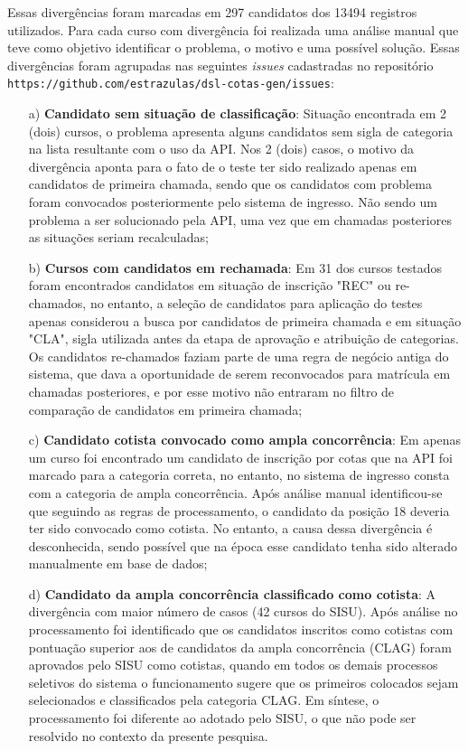 Essas divergências foram marcadas em 297 candidatos dos 13494 registros utilizados. Para cada curso com divergência foi realizada uma análise manual que teve como objetivo identificar o problema, o motivo e uma possível solução. Essas divergências foram agrupadas nas seguintes \textit{issues} cadastradas no repositório \texttt{https://github.com/estrazulas/dsl-cotas-gen/issues}:

\begin{enumerate}
    \item[a)] \textbf{Candidato sem situação de classificação}: Situação encontrada em 2 (dois) cursos, o problema apresenta alguns candidatos sem sigla de categoria na lista resultante com o uso da API. Nos 2 (dois) casos, o motivo da divergência aponta para o fato de o teste ter sido realizado apenas em candidatos de primeira chamada, sendo que os candidatos com problema foram convocados posteriormente pelo sistema de ingresso. Não sendo um problema a ser solucionado pela API, uma vez que em chamadas posteriores as situações seriam recalculadas;
    
    \item[b)] \textbf{Cursos com candidatos em rechamada}: Em 31 dos cursos testados foram encontrados candidatos em situação de inscrição "REC" ou re-chamados, no entanto, a seleção de candidatos para aplicação do testes apenas considerou a busca por candidatos de primeira chamada e em situação "CLA", sigla utilizada antes da etapa de aprovação e atribuição de categorias. Os candidatos re-chamados faziam parte de uma regra de negócio antiga do sistema, que dava a oportunidade de serem reconvocados para matrícula em chamadas posteriores, e por esse motivo não entraram no filtro de comparação de candidatos em primeira chamada;
    
    \item[c)] \textbf{Candidato cotista convocado como ampla concorrência}: Em apenas um curso foi encontrado um candidato de inscrição por cotas que na API foi marcado para a categoria correta, no entanto, no sistema de ingresso consta com a categoria de ampla concorrência. Após análise manual identificou-se que seguindo as regras de processamento, o candidato da posição 18 deveria ter sido convocado como cotista. No entanto, a causa dessa divergência é desconhecida, sendo possível que na época esse candidato tenha sido alterado manualmente em base de dados;
    
      
    \item[d)] \textbf{Candidato da ampla concorrência classificado como cotista}: A divergência com maior número de casos (42 cursos do \gls{SISU}). Após análise no processamento foi identificado que os candidatos inscritos como cotistas com pontuação superior aos de candidatos da ampla concorrência (CLAG) foram aprovados pelo \gls{SISU} como cotistas, quando em todos os demais processos seletivos do sistema o funcionamento sugere que os primeiros colocados sejam selecionados e classificados pela categoria CLAG. Em síntese, o processamento foi diferente ao adotado pelo SISU, o que não pode ser resolvido no contexto da presente pesquisa.
    
\end{enumerate}

